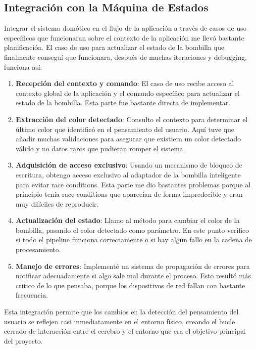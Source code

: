 \subsection{Integración con la Máquina de Estados}

Integrar el sistema domótico en el flujo de la aplicación a través de casos de uso específicos que funcionaran sobre el contexto de la aplicación me llevó bastante planificación. El caso de uso para actualizar el estado de la bombilla que finalmente conseguí que funcionara, después de muchas iteraciones y debugging, funciona así:

\begin{enumerate}
    \item \textbf{Recepción del contexto y comando}: El caso de uso recibe acceso al contexto global de la aplicación y el comando específico para actualizar el estado de la bombilla. Esta parte fue bastante directa de implementar.
    
    \item \textbf{Extracción del color detectado}: Consulto el contexto para determinar el último color que identificó en el pensamiento del usuario. Aquí tuve que añadir muchas validaciones para asegurar que existiera un color detectado válido y no datos raros que pudieran romper el sistema.
    
    \item \textbf{Adquisición de acceso exclusivo}: Usando un mecanismo de bloqueo de escritura, obtengo acceso exclusivo al adaptador de la bombilla inteligente para evitar race conditions. Esta parte me dio bastantes problemas porque al principio tenía race conditions que aparecían de forma impredecible y eran muy difíciles de reproducir.
    
    \item \textbf{Actualización del estado}: Llamo al método para cambiar el color de la bombilla, pasando el color detectado como parámetro. En este punto verifico si todo el pipeline funciona correctamente o si hay algún fallo en la cadena de procesamiento.
    
    \item \textbf{Manejo de errores}: Implementé un sistema de propagación de errores para notificar adecuadamente si algo sale mal durante el proceso. Esto resultó más crítico de lo que pensaba, porque los dispositivos de red fallan con bastante frecuencia.
\end{enumerate}

Esta integración permite que los cambios en la detección del pensamiento del usuario se reflejen casi inmediatamente en el entorno físico, creando el bucle cerrado de interacción entre el cerebro y el entorno que era el objetivo principal del proyecto.

